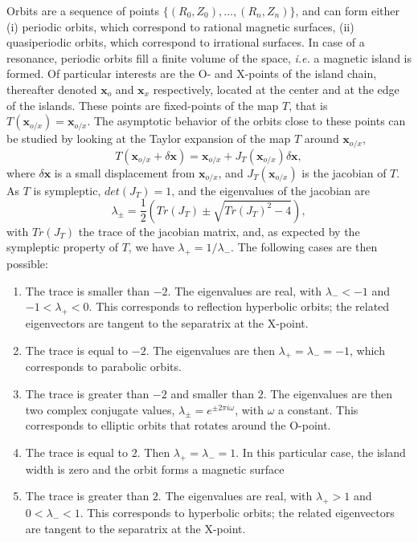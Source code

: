 \documentclass[my_thesis.tex]{subfiles}
\begin{document}
Orbits are a sequence of points $\{(R_0,Z_0),\ldots,(R_n,Z_n)\}$, and can form either (i) periodic orbits, which correspond to rational magnetic surfaces, (ii) quasiperiodic orbits, which correspond to irrational surfaces. In case of a resonance, periodic orbits fill a finite volume of the space, \textit{i.e.} a magnetic island is formed. Of particular interests are the O- and X-points of the island chain, thereafter denoted $\mathbf{x}_o$ and $\mathbf{x}_x$ respectively, located at the center and at the edge of the islands. These points are fixed-points of the map $T$, that is $T(\mathbf{x}_{o/x})=\mathbf{x}_{o/x}$. The asymptotic behavior of the orbits close to these points can be studied by looking at the Taylor expansion of the map $T$ around $\mathbf{x}_{o/x}$, 
\begin{equation}
	T(\mathbf{x}_{o/x}+\delta\mathbf{x}) = \mathbf{x}_{o/x} + J_T(\mathbf{x}_{o/x})\delta\mathbf{x},
\end{equation}
where $\delta\mathbf{x}$ is a small displacement from $\mathbf{x}_{o/x}$, and $J_T(\mathbf{x}_{o/x})$ is the jacobian of $T$. As $T$ is sympleptic, $det(J_T)=1$, and the eigenvalues of the jacobian are 
\begin{equation}
	\lambda_{\pm} = \frac{1}{2}\left(Tr(J_T)\pm\sqrt{Tr(J_T)^2 - 4}\right),
\end{equation}
with $Tr(J_T)$ the trace of the jacobian matrix, and, as expected by the sympleptic property of $T$, we have $\lambda_+ = 1/\lambda_-$. The following cases are then possible:
\begin{enumerate}
	\item The trace is smaller than $-2$. The eigenvalues are real, with $\lambda_-<-1$ and $-1<\lambda_+<0$. This corresponds to reflection hyperbolic orbits; the related eigenvectors are tangent to the separatrix at the X-point.
	\item The trace is equal to $-2$. The eigenvalues are then $\lambda_+=\lambda_-=-1$, which corresponds to parabolic orbits.
	\item The trace is greater than $-2$ and smaller than $2$. The eigenvalues are then two complex conjugate values, $\lambda_\pm=e^{\pm 2\pi i \omega}$, with $\omega$ a constant. This corresponds to elliptic orbits that rotates around the O-point.
	\item The trace is equal to $2$. Then $\lambda_+=\lambda_-=1$. In this particular case, the island width is zero and the orbit forms a magnetic surface
	\item The trace is greater than $2$. The eigenvalues are real, with $\lambda_+>1$ and $0<\lambda_-<1$. This corresponds to hyperbolic orbits; the related eigenvectors are tangent to the separatrix at the X-point.
\end{enumerate} 
\end{document}
